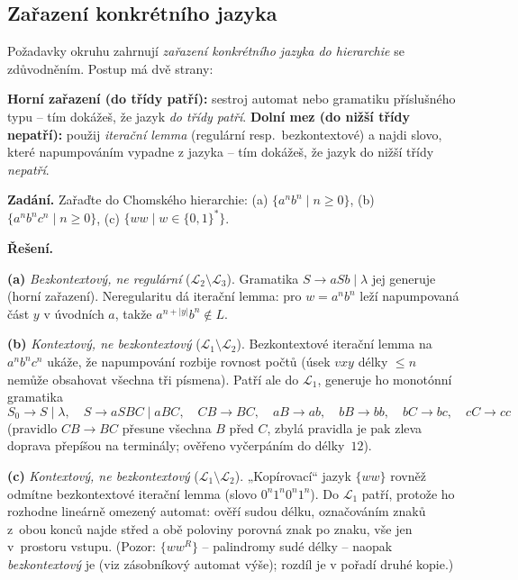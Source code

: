 \documentclass[11pt,a4paper]{article}
\begin{document}
\subsection{Zařazení konkrétního jazyka}

Požadavky okruhu zahrnují \emph{zařazení konkrétního jazyka do hierarchie} se zdůvodněním. Postup má dvě strany:

\begin{intuice}
\textbf{Horní zařazení (do třídy patří):} sestroj automat nebo gramatiku příslušného typu -- tím dokážeš, že jazyk \emph{do třídy patří}. \textbf{Dolní mez (do nižší třídy nepatří):} použij \emph{iterační lemma} (regulární resp.\ bezkontextové) a najdi slovo, které napumpováním vypadne z jazyka -- tím dokážeš, že jazyk do nižší třídy \emph{nepatří}.
\end{intuice}

\begin{priklad}
\textbf{Zadání.} Zařaďte do Chomského hierarchie: (a) $\{a^nb^n\mid n\ge 0\}$, (b) $\{a^nb^nc^n\mid n\ge 0\}$, (c) $\{ww\mid w\in\{0,1\}^*\}$.

\smallskip
\textbf{Řešení.}\par
\textbf{(a)} \emph{Bezkontextový, ne regulární} ($\mathcal L_2\setminus\mathcal L_3$). Gramatika $S\to aSb\mid\lambda$ jej generuje (horní zařazení). Neregularitu dá iterační lemma: pro $w=a^nb^n$ leží napumpovaná část $y$ v úvodních $a$, takže $a^{n+|y|}b^n\notin L$.

\textbf{(b)} \emph{Kontextový, ne bezkontextový} ($\mathcal L_1\setminus\mathcal L_2$). Bezkontextové iterační lemma na $a^nb^nc^n$ ukáže, že napumpování rozbije rovnost počtů (úsek $vxy$ délky $\le n$ nemůže obsahovat všechna tři písmena). Patří ale do $\mathcal L_1$, generuje ho monotónní gramatika
\[ S_0\to S\mid\lambda,\quad S\to aSBC\mid aBC,\quad CB\to BC,\quad aB\to ab,\quad bB\to bb,\quad bC\to bc,\quad cC\to cc \]
(pravidlo $CB\to BC$ přesune všechna $B$ před $C$, zbylá pravidla je pak zleva doprava přepíšou na terminály; ověřeno vyčerpáním do délky~$12$).

\textbf{(c)} \emph{Kontextový, ne bezkontextový} ($\mathcal L_1\setminus\mathcal L_2$). „Kopírovací`` jazyk $\{ww\}$ rovněž odmítne bezkontextové iterační lemma (slovo $0^n1^n0^n1^n$). Do $\mathcal L_1$ patří, protože ho rozhodne lineárně omezený automat: ověří sudou délku, označováním znaků z~obou konců najde střed a obě poloviny porovná znak po znaku, vše jen v~prostoru vstupu. (Pozor: $\{ww^R\}$ -- palindromy sudé délky -- naopak \emph{bezkontextový} je (viz zásobníkový automat výše); rozdíl je v pořadí druhé kopie.)
\end{priklad}
\end{document}
